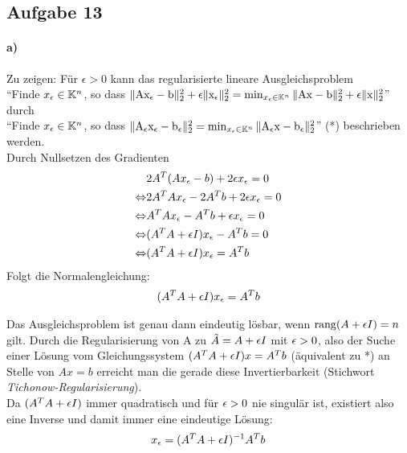 \subsection*{Aufgabe 13}

\paragraph*{a)}
Zu zeigen: Für $\epsilon > 0$ kann das regularisierte lineare Ausgleichsproblem\\
\newline
"`Finde $x_\epsilon \in \mathbb K^n$, so dass $\mathrm{\| Ax_\epsilon - b \|_2^2} + \epsilon\mathrm{\| x_\epsilon \|_2^2} = \min_{x_\epsilon \in \mathbb K^n}\mathrm{\| Ax - b \|_2^2} + \epsilon\mathrm{\| x \|_2^2}$"'  durch\\
\newline
"`Finde $x_\epsilon \in \mathbb K^n$, so dass $\mathrm{\| A_\epsilon x_\epsilon - b_\epsilon \|_2^2} = \min_{x_\epsilon \in \mathbb K^n}\mathrm{\| A_\epsilon x - b_\epsilon \|_2^2}$"' (*) beschrieben werden.\\
\newline
Durch Nullsetzen des Gradienten
\begin{align*}
&2A^T(Ax_\epsilon-b)+2\epsilon x_\epsilon = 0\\
\Leftrightarrow &2A^TAx_\epsilon -2A^Tb +2\epsilon x_\epsilon = 0\\
\Leftrightarrow &A^TAx_\epsilon -A^Tb +\epsilon x_\epsilon = 0\\
\Leftrightarrow &(A^TA +\epsilon I)x_\epsilon-A^Tb  = 0\\
\Leftrightarrow &(A^TA +\epsilon I) x_\epsilon = A^Tb\\
\end{align*}
Folgt die Normalengleichung:
\begin{align}(A^TA + \epsilon I)x_\epsilon = A^Tb\label{NGL}\end{align}

Das Ausgleichsproblem ist genau dann eindeutig lösbar, wenn $\mathrm{rang}(A+\epsilon I)=n$ gilt.
Durch die Regularisierung von A zu $\tilde{A}= A +\epsilon I$ mit $\epsilon>0$, also der Suche einer Lösung vom Gleichungssystem $(A^TA+\epsilon I)x=A^Tb$ (äquivalent zu *) an Stelle von $Ax=b$ erreicht man die gerade diese Invertierbarkeit (Stichwort \textit{Tichonow-Regularisierung}).\\
Da $(A^TA + \epsilon I)$ immer quadratisch und für $\epsilon > 0$ nie singulär ist, existiert also eine Inverse und damit immer eine eindeutige Lösung:
\begin{align}x_\epsilon = (A^TA + \epsilon I)^{-1}A^Tb\label{xeps}\end{align}


